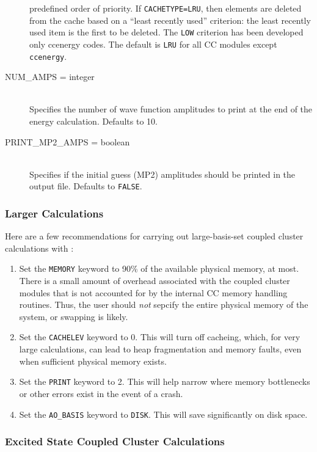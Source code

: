\begin{description}
predefined order of priority.  If {\tt CACHETYPE=LRU}, then elements are
deleted from the cache based on a ``least recently used'' criterion: the
least recently used item is the first to be deleted.  The {\tt LOW}
criterion has been developed only ccenergy codes.  The default is {\tt LRU}
for all CC modules except {\tt ccenergy}.
\item[NUM\_AMPS = integer]\mbox{}\\
Specifies the number of wave function amplitudes to print at the end of the
energy calculation.  Defaults to 10.
\item[PRINT\_MP2\_AMPS = boolean]\mbox{}\\
Specifies if the initial guess (MP2) amplitudes should be printed in the
output file.  Defaults to {\tt FALSE}.
\end{description}

\subsubsection{Larger Calculations}

Here are a few recommendations for carrying out large-basis-set coupled cluster calculations with \PSIthree: 
\begin{enumerate}
\item Set the {\tt MEMORY} keyword to 90\% of the available physical
memory, at most.  There is a small amount of overhead associated with the
coupled cluster modules that is not accounted for by the internal CC memory
handling routines.  Thus, the user should {\em not} sepcify the entire
physical memory of the system, or swapping is likely.
\item Set the {\tt CACHELEV} keyword to 0.  This will turn off cacheing,
which, for very large calculations, can lead to heap fragmentation and
memory faults, even when sufficient physical memory exists.
\item Set the {\tt PRINT} keyword to 2.  This will help narrow where
memory bottlenecks or other errors exist in the event of a crash.
\item Set the {\tt AO\_BASIS} keyword to {\tt DISK}.  This will save
significantly on disk space.
\end{enumerate}

\subsubsection{Excited State Coupled Cluster Calculations}

